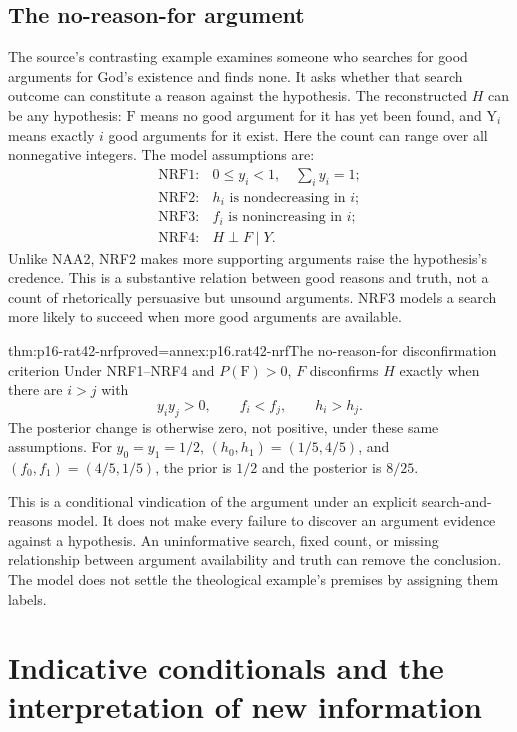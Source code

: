 \subsection{The no-reason-for argument}
\label{sec:p16-rat42-no-reason-for}

The source's contrasting example examines someone who searches for good
arguments for God's existence and finds none. It asks whether that search
outcome can constitute a reason against the hypothesis. The reconstructed
\(H\) can be any hypothesis: \(\mathrm F\) means no good argument for
it has yet been found, and \(\mathrm Y_i\) means exactly \(i\) good
arguments for it exist. Here the count can range over all nonnegative
integers. The model assumptions are:
\[
\begin{array}{ll}
 \mathrm{NRF1}:&0\leq y_i<1,\quad\sum_i y_i=1;\\
 \mathrm{NRF2}:&h_i\text{ is nondecreasing in }i;\\
 \mathrm{NRF3}:&f_i\text{ is nonincreasing in }i;\\
 \mathrm{NRF4}:&H\perp F\mid Y.
\end{array}
\]
Unlike NAA2, NRF2 makes more supporting arguments raise the hypothesis's
credence. This is a substantive relation between good reasons and truth,
not a count of rhetorically persuasive but unsound arguments. NRF3 models
a search more likely to succeed when more good arguments are available.

\begin{hbtheorem}{thm:p16-rat42-nrf}{proved=annex:p16.rat42-nrf}{The no-reason-for disconfirmation criterion}
Under NRF1--NRF4 and \(P(\mathrm F)>0\), \(F\) disconfirms \(H\)
exactly when there are \(i>j\) with
\[
            y_i y_j>0,\qquad f_i<f_j,
                           \qquad h_i>h_j.
\]
The posterior change is otherwise zero, not positive, under these
same assumptions. For \(y_0=y_1=1/2\),
\((h_0,h_1)=(1/5,4/5)\), and
\((f_0,f_1)=(4/5,1/5)\), the prior is \(1/2\) and the
posterior is \(8/25\).
\end{hbtheorem}

This is a conditional vindication of the argument under an explicit
search-and-reasons model. It does not make every failure to discover an
argument evidence against a hypothesis. An uninformative search, fixed
count, or missing relationship between argument availability and truth
can remove the conclusion. The model does not settle the theological
example's premises by assigning them labels.

\section{Indicative conditionals and the interpretation of new information}
\label{sec:p16-rat42-indicative-learning}

